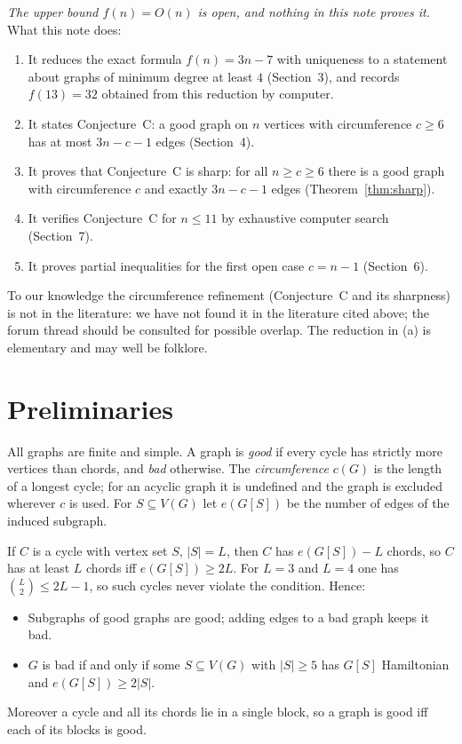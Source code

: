 \documentclass[11pt]{amsart}
\theoremstyle{remark}
\begin{document}
\emph{The upper bound $f(n)=O(n)$ is open, and nothing in this note proves it.} What this note does:
\begin{enumerate}
\item[(a)] It reduces the exact formula $f(n)=3n-7$ with uniqueness to a statement about graphs of minimum degree at least $4$ (Section~3), and records $f(13)=32$ obtained from this reduction by computer.
\item[(b)] It states Conjecture~C: a good graph on $n$ vertices with circumference $c\ge 6$ has at most $3n-c-1$ edges (Section~4).
\item[(c)] It proves that Conjecture~C is sharp: for all $n\ge c\ge 6$ there is a good graph with circumference $c$ and exactly $3n-c-1$ edges (Theorem~\ref{thm:sharp}).
\item[(d)] It verifies Conjecture~C for $n\le 11$ by exhaustive computer search (Section~7).
\item[(e)] It proves partial inequalities for the first open case $c=n-1$ (Section~6).
\end{enumerate}
To our knowledge the circumference refinement (Conjecture~C and its sharpness) is not in the literature: we have not found it in the literature cited above; the forum thread should be consulted for possible overlap. The reduction in (a) is elementary and may well be folklore.

\section{Preliminaries}

All graphs are finite and simple. A graph is \emph{good} if every cycle has strictly more vertices than chords, and \emph{bad} otherwise. The \emph{circumference} $c(G)$ is the length of a longest cycle; for an acyclic graph it is undefined and the graph is excluded wherever $c$ is used. For $S\subseteq V(G)$ let $e(G[S])$ be the number of edges of the induced subgraph.

If $C$ is a cycle with vertex set $S$, $|S|=L$, then $C$ has $e(G[S])-L$ chords, so $C$ has at least $L$ chords iff $e(G[S])\ge 2L$. For $L=3$ and $L=4$ one has $\binom L2\le 2L-1$, so such cycles never violate the condition. Hence:
\begin{itemize}
\item[(F1)] Subgraphs of good graphs are good; adding edges to a bad graph keeps it bad.
\item[(F2)] $G$ is bad if and only if some $S\subseteq V(G)$ with $|S|\ge5$ has $G[S]$ Hamiltonian and $e(G[S])\ge 2|S|$.
\end{itemize}
Moreover a cycle and all its chords lie in a single block, so a graph is good iff each of its blocks is good.
\end{document}
